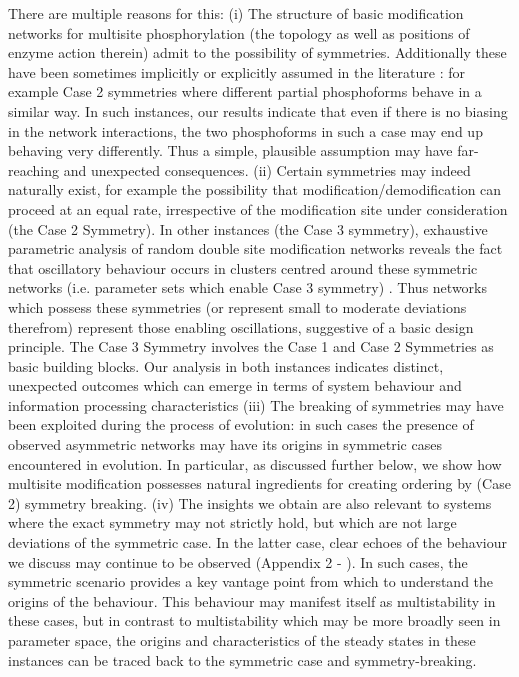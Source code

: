 \documentclass[9pt,lineno]{elife}
\begin{document}
There are multiple reasons for this: (i) The structure of basic modification networks for multisite phosphorylation (the topology as well as positions of enzyme action therein) admit to the possibility of symmetries. Additionally these have been sometimes implicitly or explicitly assumed in the literature  \cite{Sadreev2014, Enciso2017}: for example Case 2 symmetries where different partial phosphoforms behave in a similar way. In such instances, our results indicate that even if there is no biasing in the network interactions, the two phosphoforms in such a case may end up behaving very differently.
Thus a simple, plausible assumption may have far-reaching  and unexpected consequences.
(ii) Certain symmetries may indeed naturally exist, for example the possibility that modification/demodification can proceed at an equal rate, irrespective of the modification site under consideration (the Case 2 Symmetry). In other instances (the Case 3 symmetry), exhaustive parametric analysis of random double site modification networks reveals the fact that oscillatory behaviour occurs in clusters centred around these symmetric networks (i.e. parameter sets which enable Case 3 symmetry) \cite{Jolley2012}.
Thus networks which possess these symmetries (or represent small to moderate deviations therefrom) represent those enabling oscillations, suggestive of a basic design principle. The Case 3 Symmetry involves the Case 1 and Case 2 Symmetries as basic building blocks.
Our analysis in both instances indicates distinct, unexpected outcomes which can emerge in terms of system behaviour and information processing characteristics (iii) The breaking of symmetries may have been exploited during the process of evolution: in such cases the presence of observed asymmetric networks may have its origins in symmetric cases encountered in evolution. In particular, as discussed further below, we show how multisite modification possesses natural ingredients for creating ordering by  (Case 2) symmetry breaking.
(iv) The insights we obtain are also relevant to systems where the exact symmetry may not strictly hold, but which are not large deviations of the symmetric case. In the latter case, clear echoes of the behaviour we discuss may continue to be observed (Appendix 2 - ). In such cases, the symmetric scenario provides a key vantage point from which to understand the origins of the behaviour. This behaviour may manifest itself as multistability in these cases, but in contrast to multistability which may be more broadly seen in parameter space, the origins and characteristics of the steady states in these instances can be traced back to the symmetric case and symmetry-breaking.
\end{document}
